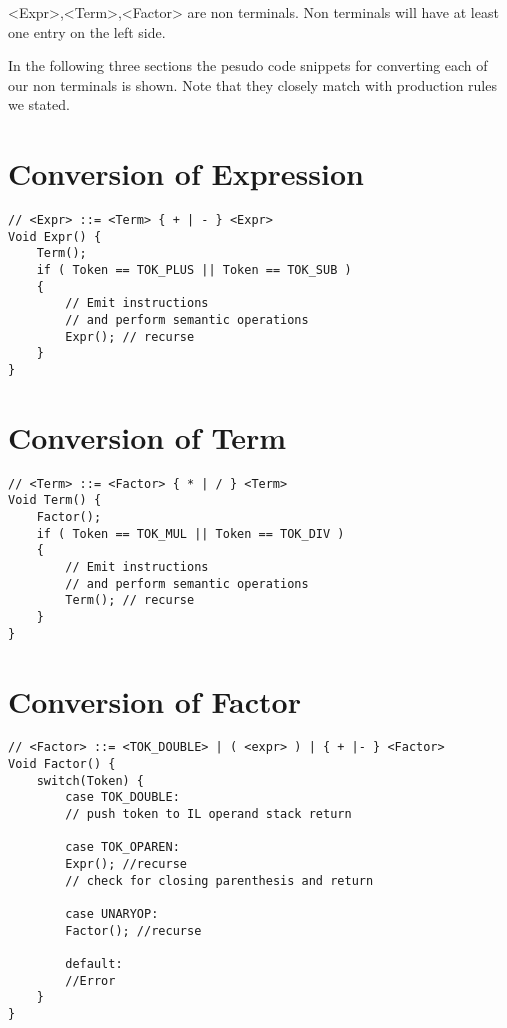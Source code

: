 <Expr>,<Term>,<Factor> are non terminals. Non terminals will have at least one entry on the left side. 


In the following three sections the pesudo code snippets for converting each of our non terminals is shown.
Note that they closely match with production rules we stated.
\section{Conversion of Expression}
\lstset{style=csharp}
\begin{lstlisting}
// <Expr> ::= <Term> { + | - } <Expr>
Void Expr() {
	Term();
	if ( Token == TOK_PLUS || Token == TOK_SUB )
	{
		// Emit instructions
		// and perform semantic operations
		Expr(); // recurse
	}
}
\end{lstlisting}

\section{Conversion of Term}
\lstset{style=csharp}
\begin{lstlisting}
// <Term> ::= <Factor> { * | / } <Term>
Void Term() {
	Factor();
	if ( Token == TOK_MUL || Token == TOK_DIV )
	{
		// Emit instructions
		// and perform semantic operations
		Term(); // recurse
	}
}
\end{lstlisting}

\section{Conversion of Factor}
\lstset{style=csharp}
\begin{lstlisting}
// <Factor> ::= <TOK_DOUBLE> | ( <expr> ) | { + |- } <Factor>
Void Factor() {
	switch(Token) {
		case TOK_DOUBLE:
		// push token to IL operand stack return
		
		case TOK_OPAREN:
		Expr(); //recurse
		// check for closing parenthesis and return

		case UNARYOP:
		Factor(); //recurse
		
		default:
		//Error
	}
}
\end{lstlisting}
